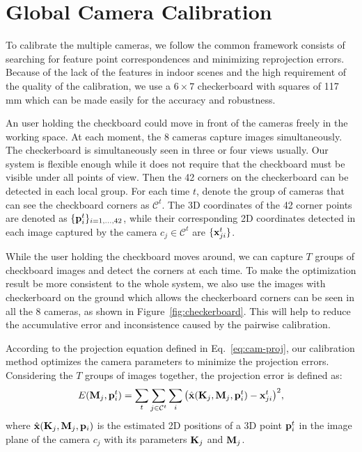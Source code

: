 
\section{Global Camera Calibration}
\label{sec:global-calib}


To calibrate the multiple cameras, we follow the common framework consists of searching for feature point correspondences and minimizing reprojection errors.
%
Because of the lack of the features in indoor scenes and the high requirement of the quality of the calibration, we use a $6\times7$ checkerboard with squares of 117 mm which can be made easily for the accuracy and robustness.

%
An user holding the checkboard could move in front of the cameras freely in the working space.
At each moment, the 8 cameras capture images simultaneously.
%
The checkerboard is simultaneously seen in three or four views usually.
%
Our system is flexible enough while it does not require that the checkboard must be visible under all points of view.
%
Then the 42 corners on the checkerboard can be detected in each local group.
%
For each time $t$, denote the group of cameras that can see the checkboard corners as $\mathcal{C}^t$. The 3D coordinates of the 42 corner points are denoted as $\{\mathbf{p}^{t}_{i}\}_{i=1,\ldots, 42}$, while their corresponding 2D coordinates detected in each image captured by the camera $c_j \in \mathcal{C}^{t}$ are $\{\mathbf{x}^{t}_{ji}\}$.



While the user holding the checkboard moves around, we can capture $T$ groups of checkboard images and detect the corners at each time.
%
To make the optimization result be more consistent to the whole system, we also use the images with checkerboard on the ground which allows the checkerboard corners can be seen in all the 8 cameras, as shown in Figure~\ref{fig:checkerboard}. This will help to reduce the accumulative error and inconsistence caused by the pairwise calibration.

According to the projection equation defined in Eq.~\ref{eq:cam-proj}, our calibration method optimizes the camera parameters to minimize the projection errors. Considering the $T$ groups of images together, the projection error is defined as:
%
\begin{equation} \label{eq:global-proj-error}
E(\mathbf{M}_{j},\mathbf{p}^{t}_{i})=\sum_{t}\sum_{j\in \mathcal{C}^{t}}\sum_{i} \big( \hat{\mathbf{x}}(\mathbf{K}_{j},\mathbf{M}_{j}, \mathbf{p}^{t}_{i})-\mathbf{x}^{t}_{ji} \big)^{2},
\end{equation}
%
where $\hat{\mathbf{x}}(\mathbf{K}_{j},\mathbf{M}_{j}, \mathbf{p}_{i})$ is the estimated 2D positions of a 3D point $\mathbf{p}^{t}_{i}$ in the image plane of the camera $c_j$ with its parameters $\mathbf{K}_j$ and $\mathbf{M}_j$.


